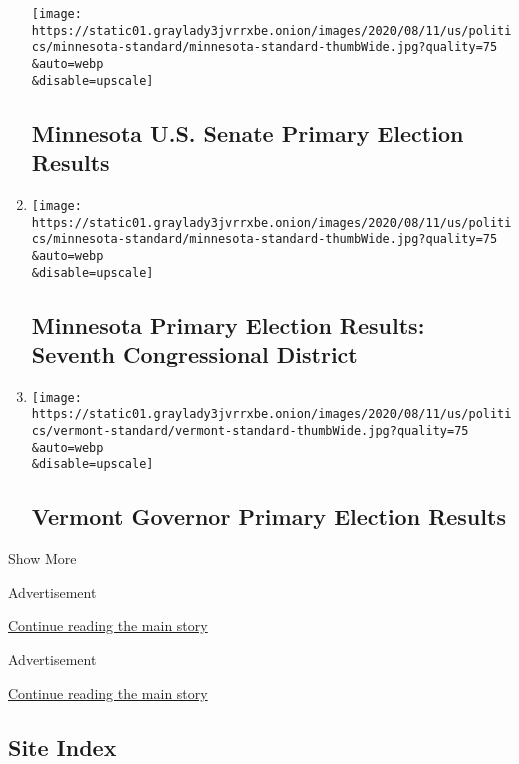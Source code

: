\begin{enumerate}
  \texttt{[image: https://static01.graylady3jvrrxbe.onion/images/2020/08/11/us/politics/minnesota-standard/minnesota-standard-thumbWide.jpg?quality=75\\\&auto=webp\\\&disable=upscale]}

  \hypertarget{minnesota-us-senate-primary-election-results}{%
  \subsection{Minnesota U.S. Senate Primary Election
  Results}\label{minnesota-us-senate-primary-election-results}}
\item
  \href{/interactive/2020/08/11/us/elections/results-minnesota-house-district-7-primary-election.html}{}

  \texttt{[image: https://static01.graylady3jvrrxbe.onion/images/2020/08/11/us/politics/minnesota-standard/minnesota-standard-thumbWide.jpg?quality=75\\\&auto=webp\\\&disable=upscale]}

  \hypertarget{minnesota-primary-election-results-seventh-congressional-district}{%
  \subsection{Minnesota Primary Election Results: Seventh Congressional
  District}\label{minnesota-primary-election-results-seventh-congressional-district}}
\item
  \href{/interactive/2020/08/11/us/elections/results-vermont-governor-primary-election.html}{}

  \texttt{[image: https://static01.graylady3jvrrxbe.onion/images/2020/08/11/us/politics/vermont-standard/vermont-standard-thumbWide.jpg?quality=75\\\&auto=webp\\\&disable=upscale]}

  \hypertarget{vermont-governor-primary-election-results}{%
  \subsection{Vermont Governor Primary Election
  Results}\label{vermont-governor-primary-election-results}}
\end{enumerate}

Show More

Advertisement

\protect\hyperlink{after-mid2}{Continue reading the main story}

Advertisement

\protect\hyperlink{after-mktg}{Continue reading the main story}

\hypertarget{site-index}{%
\subsection{Site Index}\label{site-index}}


